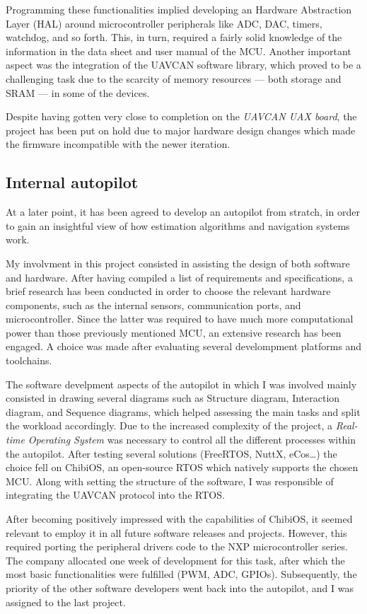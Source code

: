 Programming these functionalities implied developing an Hardware Abstraction Layer (HAL) around microcontroller peripherals like ADC, DAC, timers, watchdog, and so forth.
This, in turn, required a fairly solid knowledge of the information in the data sheet and user manual of the MCU.
Another important aspect was the integration of the UAVCAN software library, which proved to be a challenging task due to the scarcity of memory resources --- both storage and SRAM --- in some of the devices.

Despite having gotten very close to completion on the \emph{UAVCAN UAX board}, the project has been put on hold due to major hardware design changes which made the firmware incompatible with the newer iteration.


\subsection{Internal autopilot}
At a later point, it has been agreed to develop an autopilot from stratch, in order to gain an insightful view of how estimation algorithms and navigation systems work.

My involvment in this project consisted in assisting the design of both software and hardware.
After having compiled a list of requirements and specifications, a brief research has been conducted in order to choose the relevant hardware components, such as the internal sensors, communication ports, and microcontroller.
Since the latter was required to have much more computational power than those previously mentioned MCU, an extensive research has been engaged.
A choice was made after evaluating several develompment platforms and toolchains.

The software develpment aspects of the autopilot in which I was involved mainly consisted in drawing several diagrams such as Structure diagram, Interaction diagram, and Sequence diagrams, which helped assessing the main tasks and split the workload accordingly.
Due to the increased complexity of the project, a \emph{Real-time Operating System} was necessary to control all the different processes within the autopilot. 
After testing several solutions (FreeRTOS, NuttX, eCos\dots) the choice fell on ChibiOS, an open-source RTOS which natively supports the chosen MCU.
Along with setting the structure of the software, I was responsible of integrating the UAVCAN protocol into the RTOS.

After becoming positively impressed with the capabilities of ChibiOS, it seemed relevant to employ it in all future software releases and projects. 
However, this required porting the peripheral drivers code to the NXP microcontroller series.
The company allocated one week of development for this task, after which the most basic functionalities were fulfilled (PWM, ADC, GPIOs).
Subsequently, the priority of the other software developers went back into the autopilot, and I was assigned to the last project.


